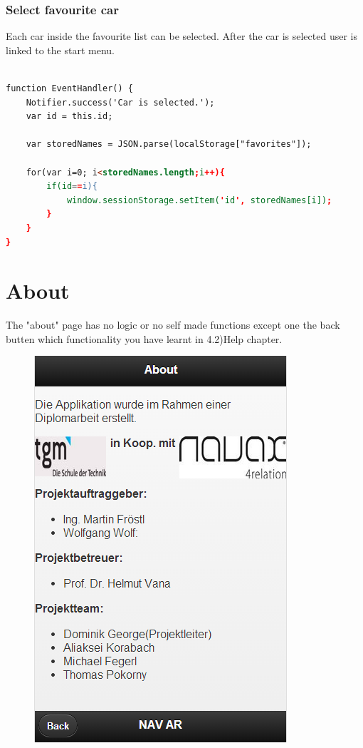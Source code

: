 \subsubsection{Select favourite car}
Each car inside the favourite list can be selected. After the car is selected user is linked to the start menu.
\\

\begin{lstlisting}[language=html, caption=
start timer function,captionpos=b] 

function EventHandler() {
	Notifier.success('Car is selected.');
	var id = this.id;
	
	var storedNames = JSON.parse(localStorage["favorites"]);
	
	for(var i=0; i<storedNames.length;i++){
		if(id==i){
			window.sessionStorage.setItem('id', storedNames[i]);
		}
	}
}
\end{lstlisting}

\section{About}
The "about" page has no logic or no self made functions except one the back butten which functionality you have learnt in 4.2)Help chapter.
\\
\begin{figure}[H]
\centering
\includegraphics[width=0.4\linewidth]{graphics/chapter4/17}
\caption{}
\label{fig:18}
\end{figure}